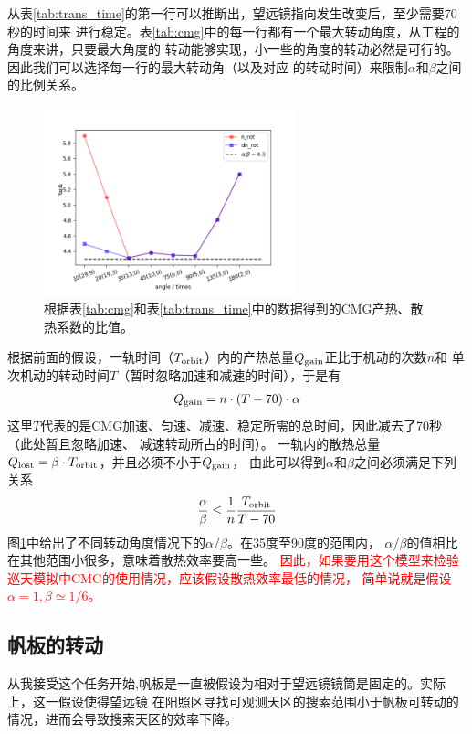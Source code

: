 \documentclass[a4paper,11pt]{ctexart}
\newcommand{\RT}[1]{\textcolor{red}{#1}}
\begin{document}
从表\ref{tab:trans_time}的第一行可以推断出，望远镜指向发生改变后，至少需要70秒的时间来
进行稳定。表\ref{tab:cmg}中的每一行都有一个最大转动角度，从工程的角度来讲，只要最大角度的
转动能够实现，小一些的角度的转动必然是可行的。因此我们可以选择每一行的最大转动角（以及对应
的转动时间）来限制$\alpha$和$\beta$之间的比例关系。

\begin{figure}[h!]
\centering
\includegraphics[width=0.65\textwidth]{figures/CMG_alpha2beta.png}
\caption{根据表\ref{tab:cmg}和表\ref{tab:trans_time}中的数据得到的CMG产热、散热系数的比值。}
\label{fig:cmg_alpha_beta}
\end{figure}

根据前面的假设，一轨时间（$T_{\rm orbit}$）内的产热总量$Q_{\rm gain}$正比于机动的次数$n$和
单次机动的转动时间$T$（暂时忽略加速和减速的时间），于是有
\begin{eqnarray}
Q_{\rm gain} = n\cdot (T-70)\cdot \alpha
\end{eqnarray}
这里$T$代表的是CMG加速、匀速、减速、稳定所需的总时间，因此减去了70秒（此处暂且忽略加速、
减速转动所占的时间）。
一轨内的散热总量$Q_{\rm lost}=\beta\cdot T_{\rm orbit}$，并且必须不小于$Q_{\rm gain}$，
由此可以得到$\alpha$和$\beta$之间必须满足下列关系
\begin{eqnarray}
\frac{\alpha}{\beta} \le \frac{1}{n} \frac{T_{\rm orbit}}{T-70}
\end{eqnarray}
图\ref{fig:cmg_alpha_beta}中给出了不同转动角度情况下的$\alpha / \beta$。在35度至90度的范围内，
$\alpha / \beta$的值相比在其他范围小很多，意味着散热效率要高一些。
\RT{\heiti 因此，如果要用这个模型来检验巡天模拟中CMG的使用情况，应该假设散热效率最低的情况，
简单说就是假设$\alpha=1,\beta\simeq 1/6$。}

\subsection{帆板的转动}
\label{sub:panel}
从我接受这个任务开始,帆板是一直被假设为相对于望远镜镜筒是固定的。实际上，这一假设使得望远镜
在阳照区寻找可观测天区的搜索范围小于帆板可转动的情况，进而会导致搜索天区的效率下降。
\end{document}
